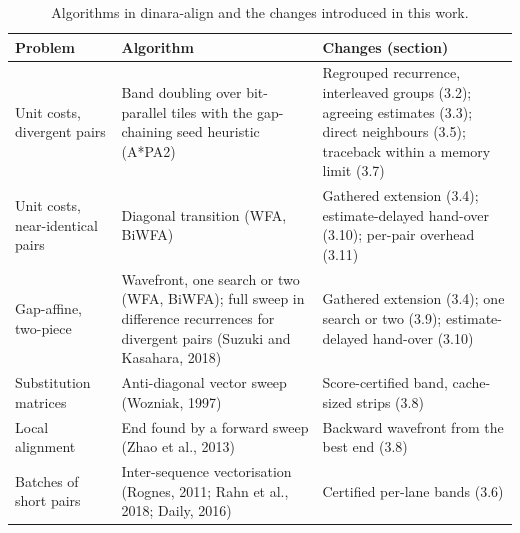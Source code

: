 \begin{table}[t]
\caption{Algorithms in dinara-align and the changes introduced in this work.}\label{tab:engines}
\centering\footnotesize
\setlength{\tabcolsep}{4pt}
\begin{tabular}{@{}l>{\raggedright\arraybackslash}p{5.2cm}>{\raggedright\arraybackslash}p{5.2cm}@{}}
\toprule
Problem & Algorithm & Changes (section) \\
\midrule
Unit costs, divergent pairs & Band doubling over bit-parallel tiles with the gap-chaining seed heuristic (A*PA2) & Regrouped recurrence, interleaved groups (3.2); agreeing estimates (3.3); direct neighbours (3.5); traceback within a memory limit (3.7) \\
Unit costs, near-identical pairs & Diagonal transition (WFA, BiWFA) & Gathered extension (3.4); estimate-delayed hand-over (3.10); per-pair overhead (3.11) \\
Gap-affine, two-piece & Wavefront, one search or two (WFA, BiWFA); full sweep in difference recurrences for divergent pairs (Suzuki and Kasahara, 2018) & Gathered extension (3.4); one search or two (3.9); estimate-delayed hand-over (3.10) \\
Substitution matrices & Anti-diagonal vector sweep (Wozniak, 1997) & Score-certified band, cache-sized strips (3.8) \\
Local alignment & End found by a forward sweep (Zhao et al., 2013) & Backward wavefront from the best end (3.8) \\
Batches of short pairs & Inter-sequence vectorisation (Rognes, 2011; Rahn et al., 2018; Daily, 2016) & Certified per-lane bands (3.6) \\
\bottomrule
\end{tabular}
\end{table}
